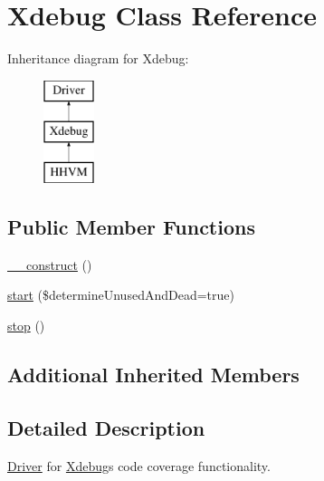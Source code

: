 \hypertarget{class_sebastian_bergmann_1_1_code_coverage_1_1_driver_1_1_xdebug}{}\section{Xdebug Class Reference}
\label{class_sebastian_bergmann_1_1_code_coverage_1_1_driver_1_1_xdebug}
Inheritance diagram for Xdebug\+:\begin{figure}[H]
\begin{center}
\leavevmode
\includegraphics[height=3.000000cm]{class_sebastian_bergmann_1_1_code_coverage_1_1_driver_1_1_xdebug}
\end{center}
\end{figure}
\subsection*{Public Member Functions}
\begin{DoxyCompactItemize}
\item 
\mbox{\hyperlink{class_sebastian_bergmann_1_1_code_coverage_1_1_driver_1_1_xdebug_a095c5d389db211932136b53f25f39685}{\+\_\+\+\_\+construct}} ()
\item 
\mbox{\hyperlink{class_sebastian_bergmann_1_1_code_coverage_1_1_driver_1_1_xdebug_aa3dfff26cb483c3eadbf2418e1729671}{start}} (\$determine\+Unused\+And\+Dead=true)
\item 
\mbox{\hyperlink{class_sebastian_bergmann_1_1_code_coverage_1_1_driver_1_1_xdebug_a8b6fc76a620d7557d06e9a11a9ffb509}{stop}} ()
\end{DoxyCompactItemize}
\subsection*{Additional Inherited Members}


\subsection{Detailed Description}
\mbox{\hyperlink{interface_sebastian_bergmann_1_1_code_coverage_1_1_driver_1_1_driver}{Driver}} for \mbox{\hyperlink{class_sebastian_bergmann_1_1_code_coverage_1_1_driver_1_1_xdebug}{Xdebug}}\textquotesingle{}s code coverage functionality.

